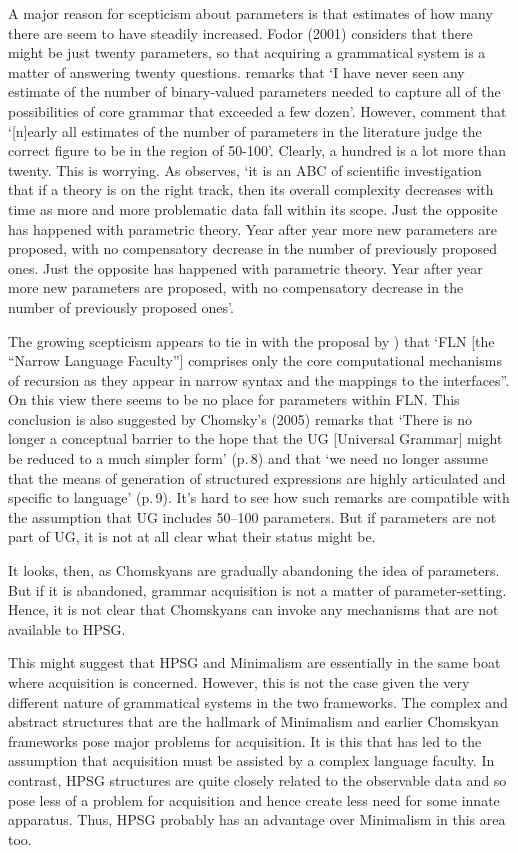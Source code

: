 \documentclass[output=paper]{langsci/langscibook}
\begin{document}
A major reason for scepticism about parameters is that estimates of how many there are seem to have
steadily increased. Fodor (2001) considers that there might be just twenty parameters, so that
acquiring a grammatical system is a matter of answering twenty questions. \citet[]{Newmeyer2005a} remarks that ‘I have never seen any estimate of the number of binary-valued
parameters needed to capture all of the possibilities of core grammar that exceeded a few
dozen’. However, \citet{RH2005a} comment that ‘[n]early all estimates of the number of
parameters in the literature judge the correct figure to be in the region of 50-100’. Clearly, a
hundred is a lot more than twenty. This is worrying. As \citet[]{Newmeyer2006a-u} observes, ‘it
is an ABC of scientific investigation that if a theory is on the right track, then its overall
complexity decreases with time as more and more problematic data fall within its scope. Just the
opposite has happened with parametric theory. Year after year more new parameters are proposed, with
no compensatory decrease in the number of previously proposed ones. Just the opposite has happened
with parametric theory. Year after year more new parameters are proposed, with no compensatory
decrease in the number of previously proposed ones’.

The growing scepticism appears to tie in with the proposal by \citet[]{HCF2002a})
that ‘FLN [the ``Narrow Language Faculty''] comprises only the core computational mechanisms of
recursion as they appear in narrow syntax and the mappings to the interfaces”. On this view there
seems to be no place for parameters within FLN. This conclusion is also suggested by Chomsky’s
(2005) remarks that ‘There is no longer a conceptual barrier to the hope that the UG [Universal
  Grammar] might be reduced to a much simpler form’ (p.\,8) and that ‘we need no longer assume that
the means of generation of structured expressions are highly articulated and specific to language’
(p.\,9). It’s hard to see how such remarks are compatible with the assumption that UG includes 50--100
parameters. But if parameters are not part of UG, it is not at all clear what their status might be.

It looks, then, as Chomskyans are gradually abandoning the idea of parameters. But if it is
abandoned, grammar acquisition is not a matter of parameter-setting. Hence, it is not clear that
Chomskyans can invoke any mechanisms that are not available to HPSG.

This might suggest that HPSG and Minimalism are essentially in the same boat where acquisition is
concerned. However, this is not the case given the very different nature of grammatical systems in
the two frameworks. The complex and abstract structures that are the hallmark of Minimalism and
earlier Chomskyan frameworks pose major problems for acquisition. It is this that has led to the
assumption that acquisition must be assisted by a complex language faculty. In contrast, HPSG
structures are quite closely related to the observable data and so pose less of a problem for
acquisition and hence create less need for some innate apparatus. Thus, HPSG probably has an
advantage over Minimalism in this area too.
\end{document}
